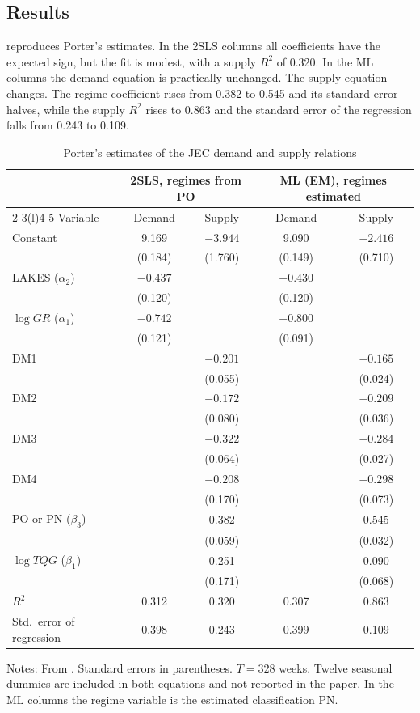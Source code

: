 \subsection{Results}\label{sec:13-jec-results}

 reproduces Porter's estimates. In the 2SLS columns all coefficients have the expected sign,
but the fit is modest, with a supply $R^2$ of 0.320. In the ML columns the demand equation is practically unchanged.
The supply equation changes. The regime coefficient rises from 0.382 to 0.545 and its standard error halves, while the
supply $R^2$ rises to 0.863 and the standard error of the regression falls from 0.243 to 0.109.

\begin{table}[htbp]
\centering
\caption{Porter's estimates of the JEC demand and supply relations}\label{tab:13-porter-t3}
\small
\begin{tabular}{@{}lcccc@{}}
\toprule
 & \multicolumn{2}{c}{2SLS, regimes from PO} & \multicolumn{2}{c}{ML (EM), regimes estimated}\\
\cmidrule(lr){2-3}\cmidrule(l){4-5}
Variable & Demand & Supply & Demand & Supply\\
\midrule
Constant & 9.169 & $-3.944$ & 9.090 & $-2.416$\\
 & (0.184) & (1.760) & (0.149) & (0.710)\\
LAKES ($\alpha_2$) & $-0.437$ & & $-0.430$ & \\
 & (0.120) & & (0.120) & \\
$\log GR$ ($\alpha_1$) & $-0.742$ & & $-0.800$ & \\
 & (0.121) & & (0.091) & \\
DM1 & & $-0.201$ & & $-0.165$\\
 & & (0.055) & & (0.024)\\
DM2 & & $-0.172$ & & $-0.209$\\
 & & (0.080) & & (0.036)\\
DM3 & & $-0.322$ & & $-0.284$\\
 & & (0.064) & & (0.027)\\
DM4 & & $-0.208$ & & $-0.298$\\
 & & (0.170) & & (0.073)\\
PO or PN ($\beta_3$) & & 0.382 & & 0.545\\
 & & (0.059) & & (0.032)\\
$\log TQG$ ($\beta_1$) & & 0.251 & & 0.090\\
 & & (0.171) & & (0.068)\\
\midrule
$R^2$ & 0.312 & 0.320 & 0.307 & 0.863\\
Std.\ error of regression & 0.398 & 0.243 & 0.399 & 0.109\\
\bottomrule
\end{tabular}

\smallskip
\begin{minipage}{0.9\textwidth}\footnotesize
Notes: From \citet[Table~3]{Porter1983}. Standard errors in parentheses. $T = 328$ weeks. Twelve seasonal dummies
are included in both equations and not reported in the paper. In the ML columns the regime variable is the estimated
classification PN.
\end{minipage}
\end{table}

